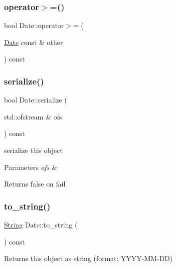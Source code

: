 \mbox{\label{classDate_ac1bca91434bf336beb5372ee4a2ca46f}} 
\subsubsection{\texorpdfstring{operator$>$=()}{operator>=()}}
{\footnotesize\ttfamily bool Date\+::operator$>$= (\begin{DoxyParamCaption}\item[{\hyperlink{classDate}{Date} const \&}]{other }\end{DoxyParamCaption}) const}

\mbox{\label{classDate_aaa7c624e382fff1ba3438cb46232c05e}} 
\subsubsection{\texorpdfstring{serialize()}{serialize()}}
{\footnotesize\ttfamily bool Date\+::serialize (\begin{DoxyParamCaption}\item[{std\+::ofstream \&}]{ofs }\end{DoxyParamCaption}) const}

serialize this object 
\begin{DoxyParams}{Parameters}
{\em ofs} & \\
\hline
\end{DoxyParams}
\begin{DoxyReturn}{Returns}
false on fail 
\end{DoxyReturn}
\mbox{\label{classDate_a4d4dfda9dfa34c87e06381254bfe5151}} 
\subsubsection{\texorpdfstring{to\+\_\+string()}{to\_string()}}
{\footnotesize\ttfamily \hyperlink{classString}{String} Date\+::to\+\_\+string (\begin{DoxyParamCaption}{ }\end{DoxyParamCaption}) const}

\begin{DoxyReturn}{Returns}
this object as string (format\+: Y\+Y\+Y\+Y-\/\+M\+M-\/\+DD) 
\end{DoxyReturn}


